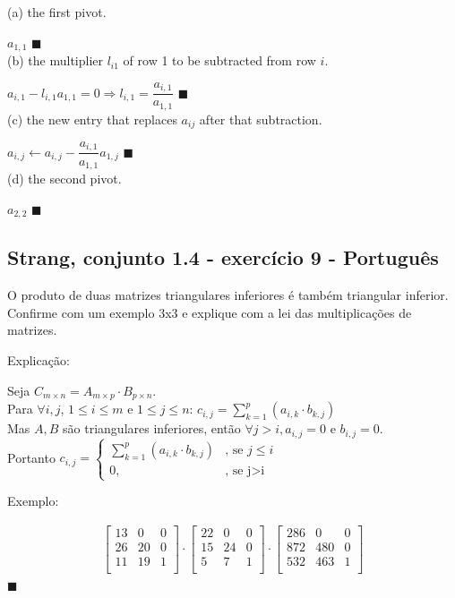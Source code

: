 \documentclass[12pt,a4paper]{article}
\newcommand{\qed}{\hfill $\blacksquare$}
\begin{document}
(a) the first pivot.

$ a_{1,1} $
\qed
\\

(b) the multiplier $ l_{i1} $ of row 1 to be subtracted from row $ i $.

$ a_{i,1} - l_{i,1}a_{1,1} = 0 \Rightarrow l_{i,1} = \dfrac{a_{i,1}}{a_{1,1}} $
\qed
\\

(c) the new entry that replaces $ a_{ij} $ after that subtraction.

$ a_{i,j} \leftarrow a_{i,j} - \dfrac{a_{i,1}}{a_{1,1}}a_{1,j} $
\qed
\\

(d) the second pivot.

$ a_{2,2} $
\qed


\subsection*{Strang, conjunto 1.4 - exercício 9 - Português}
O produto de duas matrizes triangulares inferiores é também triangular inferior. Confirme com um exemplo 3x3 e explique com a lei das multiplicações de matrizes.

Explicação:

Seja $ C_{m\times n} = A_{m \times p}\cdot B_{p \times n} $.
\\

Para $ \forall i,j $, $ 1\leq i \leq m $ e $ 1\leq j \leq n $: 
$
c_{i,j} = \sum_{k=1}^{p} (a_{i,k}\cdot b_{k,j})
$
\\

Mas $ A,B $ são triangulares inferiores, então $ \forall j>i, a_{i,j}=0 $ e $ b_{i,j} = 0 $.
\\

Portanto $ c_{i,j} = \begin{cases}
\sum_{k=1}^{p} (a_{i,k}\cdot b_{k,j})&\text{, se } j\leq i\\
0, &\text{, se j>i }
\end{cases} $

Exemplo:

\begin{align*}
\begin{bmatrix}
13 & 0 & 0 \\ 
26 & 20 & 0 \\ 
11 & 19 & 1 \\ 
\end{bmatrix}
\cdot
\begin{bmatrix}
22 & 0 & 0 \\ 
15 & 24 & 0 \\ 
5 & 7 & 1 \\ 
\end{bmatrix}
\cdot
\begin{bmatrix}
286 & 0 & 0 \\ 
872 & 480 & 0 \\ 
532 & 463 & 1 \\ 
\end{bmatrix}
\end{align*}
\qed
\end{document}
